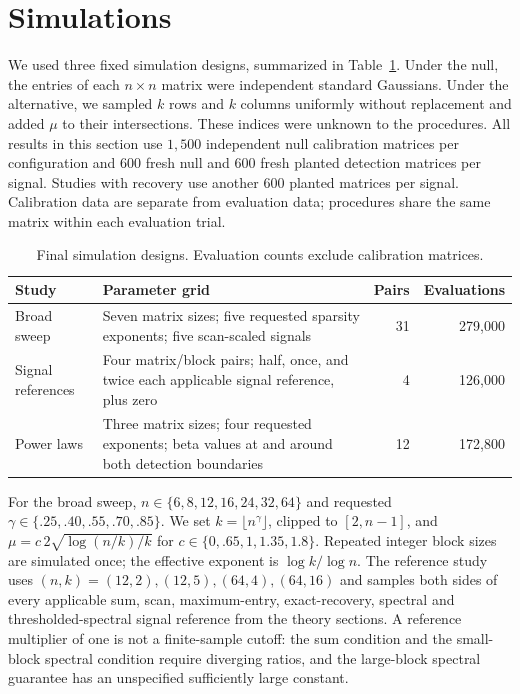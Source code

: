 \section{Simulations}\label{sec:simulations}
We used three fixed simulation designs, summarized in Table~\ref{tab:study-designs}.
Under the null, the entries of each $n\times n$ matrix were independent standard
Gaussians. Under the alternative, we sampled $k$ rows and $k$ columns uniformly
without replacement and added $\mu$ to their intersections. These indices were
unknown to the procedures. All results in this section use $1{,}500$ independent
null calibration matrices per configuration and $600$ fresh null and $600$ fresh
planted detection matrices per signal. Studies with recovery use another $600$
planted matrices per signal. Calibration data are separate from evaluation data;
procedures share the same matrix within each evaluation trial.

\begin{table}[H]\centering\small
\caption{Final simulation designs. Evaluation counts exclude calibration matrices.}
\label{tab:study-designs}
\begin{tabularx}{\textwidth}{@{}lXrr@{}}\toprule
Study & Parameter grid & Pairs & Evaluations \\
\midrule
Broad sweep & Seven matrix sizes; five requested sparsity exponents; five scan-scaled signals & 31 & 279,000 \\
Signal references & Four matrix/block pairs; half, once, and twice each applicable signal reference, plus zero & 4 & 126,000 \\
Power laws & Three matrix sizes; four requested exponents; beta values at and around both detection boundaries & 12 & 172,800 \\
\bottomrule\end{tabularx}
\end{table}

For the broad sweep, $n\in\{6,8,12,16,24,32,64\}$ and requested
$\gamma\in\{.25,.40,.55,.70,.85\}$. We set $k=\lfloor n^\gamma\rfloor$,
clipped to $[2,n-1]$, and $\mu=c\,2\sqrt{\log(n/k)/k}$ for
$c\in\{0,.65,1,1.35,1.8\}$. Repeated integer block sizes are simulated once;
the effective exponent is $\log k/\log n$. The reference study uses
$(n,k)=(12,2),(12,5),(64,4),(64,16)$ and samples both sides of every applicable
sum, scan, maximum-entry, exact-recovery, spectral and thresholded-spectral
signal reference from the theory sections. A reference multiplier of one is
not a finite-sample cutoff: the sum condition and the small-block spectral
condition require diverging ratios, and the large-block spectral guarantee
has an unspecified sufficiently large constant.

